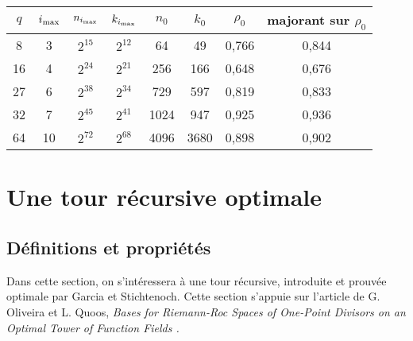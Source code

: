\documentclass[10pt]{article}
\newcommand{\s}{\vspace{0.3cm}}
\newcommand{\ii}{i_{\rm{max}}}
\begin{document}
\newpage

\begin{center}
\begin{tabular}{|c|c|c|c|c|c|c|c|}
\hline
$q$ & $\ii$ & $n_{\ii}$ & $k_{\ii}$ & $n_0$ & $k_0$ & $\rho_0$ & majorant sur $\rho_0$ \\ 
\hline
8 & 3 & $2^{15}$ & $2^{12}$ & 64 & 49 & 0,766 & 0,844 \\
\hline
16 & 4 & $2^{24}$ & $2^{21}$ & 256 & 166 & 0,648 & 0,676 \\
\hline
27 & 6 & $2^{38}$ & $2^{34}$ & 729 & 597 & 0,819 & 0,833 \\
\hline
32 & 7 & $2^{45}$ & $2^{41}$ & 1024 & 947 & 0,925 & 0,936 \\
\hline
64 & 10 & $2^{72}$ & $2^{68}$ & 4096 & 3680 & 0,898 & 0,902 \\
\hline
\end{tabular}
\end{center}

\s

\section{Une tour récursive optimale}

\s

\subsection{Définitions et propriétés}

\s

Dans cette section, on s’intéressera à une tour récursive, introduite et prouvée optimale par Garcia et Stichtenoch. Cette section s'appuie sur l'article de G. Oliveira et L. Quoos, \it{Bases for Riemann-Roc Spaces of One-Point Divisors on an Optimal Tower of Function Fields} \rm.
\end{document}
